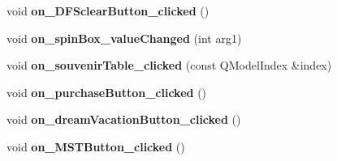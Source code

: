 \begin{DoxyCompactItemize}
void {\bfseries on\+\_\+\+D\+F\+Sclear\+Button\+\_\+clicked} ()
\item 
\mbox{\label{class_main_window_ab563c0d9e0225b55585cbfdba998c3cc}} 
void {\bfseries on\+\_\+spin\+Box\+\_\+value\+Changed} (int arg1)
\item 
\mbox{\label{class_main_window_a1ca615293b8c2dbeef99dbf61e82bb55}} 
void {\bfseries on\+\_\+souvenir\+Table\+\_\+clicked} (const Q\+Model\+Index \&index)
\item 
\mbox{\label{class_main_window_a1a7f2c3750064fcfc2af7b82e6e1f649}} 
void {\bfseries on\+\_\+purchase\+Button\+\_\+clicked} ()
\item 
\mbox{\label{class_main_window_aea2558859c02d5d8526863c8d3a1c272}} 
void {\bfseries on\+\_\+dream\+Vacation\+Button\+\_\+clicked} ()
\item 
\mbox{\label{class_main_window_a1d1b4ddc9165c7c0b8b4621cca3318a0}} 
void {\bfseries on\+\_\+\+M\+S\+T\+Button\+\_\+clicked} ()
\end{DoxyCompactItemize}

